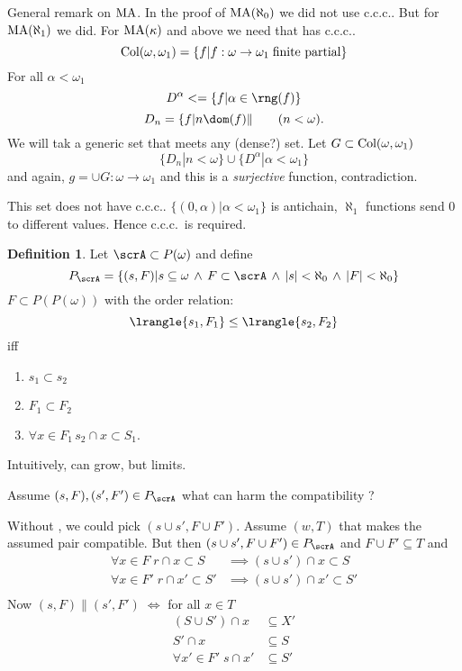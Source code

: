 \documentclass[11pt,pdftex,twoside,a4paper]{article}
\newcommand{\finitepartial}{\textnormal{finite partial}}
\newcommand{\MA}{\ensuremath{\mathop{\rm MA}\nolimits}}
\newcommand{\ccc}{c.c.c.}
\theoremstyle{definition}
\newtheorem{ldef}[thm]{Definition}
\begin{document}
General remark on \MA.
In the proof of \(\MA(\aleph_0)\) we did not use \ccc.
But for \(\MA(\aleph_1)\) we did.
For \(\MA(\kappa)\) and above we need that  has \ccc.
\begin{equation*}
\textnormal{Col}(\omega,\omega_1) 
  = \{f| f: \omega\to\omega_1 \;\finitepartial\}
\end{equation*}
For all \(\alpha< \omega_1\)
\begin{equation*}
D^\alpha< = \{f| \alpha\in\rng(f)\}
\end{equation*}
\begin{equation*}
D_n = \{f| n \dom(f)\| \qquad (n < \omega).
\end{equation*}
We will tak a generic set that meets any (dense?) set.
Let \(G\subset \textnormal{Col}(\omega,\omega_1)\)
\begin{equation*}
\{D_n| n < \omega\} \cup \{D^\alpha| \alpha < \omega_1\}
\end{equation*}
and again, \(g = \cup G: \omega\to\omega_1\)
and this is a \emph{surjective} function, contradiction.

This set does not have \ccc.
\(\{(0,\alpha)| \alpha < \omega_1\}\) is antichain, 
\(\aleph_1\) functions send $0$ to different values. Hence \ccc\ is required.

\begin{ldef}
Let \(\scrA \subset P(\omega)\) and define
\begin{equation*}
P_\scrA = \{(s,F)|  s\subseteq\omega \,\land\, F\subset\scrA 
  \,\land\, |s|<\aleph_0 \,\land\, |F|<\aleph_0\}
\end{equation*}
\(F\subset P(P(\omega))\) with the order relation:
\begin{equation*}
  \lrangle{s_1,F_1} \leq \lrangle{s_2,F_2}
\end{equation*}
iff
\begin{enumerate}
\item \(s_1 \subset s_2\)
\item \(F_1 \subset F_2\)
\item \(\forall x\in F_1\, s_2\cap x \subset S_1\).
\end{enumerate}
\end{ldef}
Intuitively, can grow, but  limits.

Assume \((s,F), (s',F') \in P_\scrA\) what can harm the compatibility ?

Without , we could pick \((s\cup s',F\cup F')\).
Assume \((w,T)\) that makes the assumed pair compatible. But then 
\((s\cup s',F\cup F')\in P_\scrA\) and \(F\cup F' \subseteq T\)
and
\begin{align*}
\forall x\in F\;
r \cap x \subset S   &\implies (s\cup s')\cap x\subset S \\
\forall x\in F'\;
r \cap x' \subset S' &\implies (s\cup s')\cap x'\subset S' \\
\end{align*}
Now \((s,F) \| (s', F') \; \Leftrightarrow\)
for all \(x\in T\) %
\begin{align*}
(S\cup S')\cap x &\subseteq X'\\
S'\cap x &\subseteq S\\
\forall x'\in F'\; s \cap x' &\subseteq S'
\end{align*}
\end{document}

